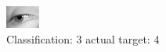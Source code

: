 \begin{figure}[h!]
\begin{center}
\includegraphics[width=0.60\columnwidth]{figures/ID3045_class_3_target_4.png}
\end{center}
\caption{ Classification: 3 actual target: 4}
\label{fig:ID3045_class_3_target_4}
\end{figure}
